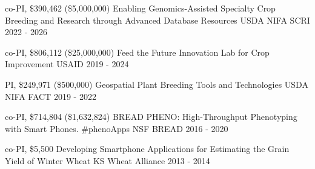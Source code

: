 \begin{cvgrants}

  \cvgrant
    {co-PI, \$390,462 (\$5,000,000)}
    {Enabling Genomics-Assisted Specialty Crop Breeding and Research through Advanced Database Resources}
    {USDA NIFA SCRI} %
    {2022 - 2026}
    {
    }

  \cvgrant
    {co-PI, \$806,112 (\$25,000,000)}
    {Feed the Future Innovation Lab for Crop Improvement}
    {USAID} %
    {2019 - 2024}
    {
    }

  \cvgrant
    {PI, \$249,971 (\$500,000)} %
    {Geospatial Plant Breeding Tools and Technologies}
    {USDA NIFA FACT} %
    {2019 - 2022}
    {
    }

  \cvgrant
    {co-PI, \$714,804 (\$1,632,824)} %
    {BREAD PHENO: High-Throughput Phenotyping with Smart Phones. \#phenoApps}
    {NSF BREAD} %
    {2016 - 2020}
    {
    }

  \cvgrant
    {co-PI, \$5,500} %
    {Developing Smartphone Applications for Estimating the Grain Yield of Winter Wheat}
    {KS Wheat Alliance}
    {2013 - 2014}
    {
    }

\end{cvgrants}
